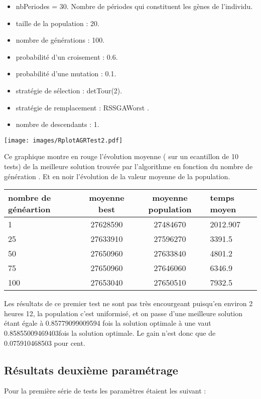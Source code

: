 \documentclass[a4paper]{report}
\begin{document}
\begin{itemize}
\item nbPeriodes = 30. Nombre de périodes qui constituent les gènes de l'individu.
\item taille de la population : 20.
\item nombre de générations : 100.
\item probabilité d'un croisement : 0.6.
\item probabilité d'une mutation : 0.1.
\item stratégie de sélection : detTour(2).
\item stratégie de remplacement : RSSGAWorst .
\item nombre de descendants : 1.

\end{itemize}
\begin{center}
\texttt{[image: images/RplotAGRTest2.pdf]}
\end{center}
Ce graphique montre  en rouge l'évolution moyenne ( sur un ecantillon de 10 tests) de la  meilleure solution trouvée par l'algorithme en fonction du nombre de génération . Et en noir l'évolution de la valeur moyenne de la population.\\
\begin{tabular}{|l|c|c|l|}
  \hline
  nombre de généartion &moyenne best &moyenne population&temps moyen\\

  \hline
 1 &27628590 &27484670&2012.907\\
  \hline
25 &  27633910& 27596270&  3391.5
\\
  \hline
  50&  27650960&27633840&4801.2
\\
  \hline
  75 &27650960&27646060&6346.9


\\
  \hline
 100 &  27653040&27650510& 7932.5 \\
  \hline


\end{tabular}
Les résultats de ce premier test ne sont pas très encourgeant puisqu'en environ  2 heures 12, la population c'est uniformisé, et on passe d'une meilleure solution étant égale à 0.85779099009594 fois la solution optimale  à une vaut 0.85855009469403fois la solution optimale. Le gain n'est donc que de 0.075910468503 pour cent.
\subsection{Résultats deuxième paramétrage}
Pour la première série de tests les paramètres étaient les suivant :\\
\end{document}
